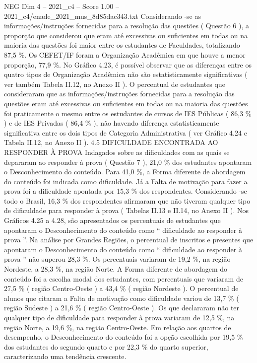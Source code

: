\begin{textsample}{NEG Dim 4 – 2021\_c4 – Score 1.00 – 2021\_c4/enade\_2021\_mus\_8d85dac343.txt}
Considerando -se as informações/instruções fornecidas para a resolução das questões ( Questão 6 ), a proporção que considerou que eram até excessivas ou suficientes em todas ou na maioria das questões foi maior entre os estudantes de Faculdades, totalizando 87,5 \%.
Os CEFET/IF foram a Organização Acadêmica em que houve a menor proporção, 77,9 \%.
No Gráfico 4.23, é possível observar que as diferenças entre os quatro tipos de Organização Acadêmica não são estatisticamente significativas ( ver também Tabela II.12, no Anexo II ).
O percentual de estudantes que consideraram que as informações/instruções fornecidas para a resolução das questões eram até excessivas ou suficientes em todas ou na maioria das questões foi praticamente o mesmo entre os estudantes de cursos de IES Públicas ( 86,3 \% ) e de IES Privadas ( 86,4 \% ), não havendo diferença estatisticamente significativa entre os dois tipos de Categoria Administrativa ( ver Gráfico 4.24 e Tabela II.12, no Anexo II ). 4.5 DIFICULDADE ENCONTRADA AO RESPONDER À PROVA Indagados sobre as dificuldades com as quais se depararam ao responder à prova ( Questão 7 ), 21,0 \% dos estudantes apontaram o Desconhecimento do conteúdo.
Para 41,0 \%, a Forma diferente de abordagem do conteúdo foi indicada como dificuldade.
Já a Falta de motivação para fazer a prova foi a dificuldade apontada por 15,3 \% dos respondentes.
Considerando -se todo o Brasil, 16,3 \% dos respondentes afirmaram que não tiveram qualquer tipo de dificuldade para responder à prova ( Tabelas II.13 e II.14, no Anexo II ).
Nos Gráficos 4.25 a 4.28, são apresentados os percentuais de estudantes que apontaram o Desconhecimento do conteúdo como “ dificuldade ao responder à prova ”.
Na análise por Grandes Regiões, o percentual de inscritos e presentes que apontaram o Desconhecimento do conteúdo como “ dificuldade ao responder à prova ” não superou 28,3 \%.
Os percentuais variaram de 19,2 \%, na região Nordeste, a 28,3 \%, na região Norte.
A Forma diferente de abordagem do conteúdo foi a escolha modal dos estudantes, com percentuais que variaram de 27,5 \% ( região Centro-Oeste ) a 43,4 \% ( região Nordeste ).
O percentual de alunos que citaram a Falta de motivação como dificuldade variou de 13,7 \% ( região Sudeste ) a 21,6 \% ( região Centro-Oeste ).
Os que declararam não ter qualquer tipo de dificuldade para responder à prova variaram de 12,5 \%, na região Norte, a 19,6 \%, na região Centro-Oeste.
Em relação aos quartos de desempenho, o Desconhecimento do conteúdo foi a opção escolhida por 19,5 \% dos estudantes do segundo quarto e por 22,3 \% do quarto superior, caracterizando uma tendência crescente.

\end{textsample}

